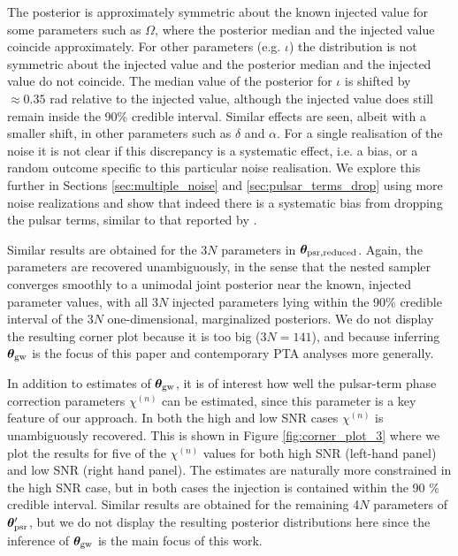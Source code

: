 \documentclass[fleqn,usenatbib,useAMS]{mnras}
\begin{document}
The posterior is approximately symmetric about the known injected value for some parameters such as $\Omega$, where the posterior median and the injected value coincide approximately. For other parameters (e.g. $\iota$) the distribution is not symmetric about the injected value and the posterior median and the injected value do not coincide. The median value of the posterior for $\iota$ is shifted by $\approx 0.35$ rad relative to the injected value, although the injected value does still remain inside the 90\% credible interval. Similar effects are seen, albeit with a smaller shift, in other parameters such as $\delta$ and $\alpha$. For a single realisation of the noise it is not clear if this discrepancy is a systematic effect, i.e. a bias, or a random outcome specific to this particular noise realisation. We explore this further in Sections \ref{sec:multiple_noise} and \ref{sec:pulsar_terms_drop} using more noise realizations and show that indeed there is a systematic bias from dropping the pulsar terms, similar to that reported by \cite{Zhupulsarterms}. \newline 

Similar results are obtained for the 3$N$ parameters in $\boldsymbol{\theta}_{\rm psr, reduced}$. Again, the parameters are recovered unambiguously, in the sense that the nested sampler converges smoothly to a unimodal joint posterior near the known, injected parameter values, with all $3N$ injected parameters lying within the 90\% credible interval of the $3N$ one-dimensional, marginalized posteriors. We do not display the resulting corner plot because it is too big ($3N = 141$), and because inferring ${\boldsymbol{\theta}}_{\rm gw}$ is the focus of this paper and contemporary PTA analyses more generally.


In addition to estimates of $\boldsymbol{\theta}_{\rm gw}$, it is of interest how well the pulsar-term phase correction parameters $\chi^{(n)}$ can be estimated, since this parameter is a key feature of our approach. In both the high and low SNR cases $\chi^{(n)}$ is unambiguously recovered. 
This is shown in Figure \ref{fig:corner_plot_3} where we plot the results for five of the $\chi^{(n)}$ values for both high SNR (left-hand panel) and low SNR (right hand panel). The estimates are naturally more constrained in the high SNR case, but in both cases the injection is contained within the 90 \% credible interval. Similar results are obtained for the remaining 4$N$ parameters of $\boldsymbol{\theta}_{\rm psr}'$, but we do not display the resulting posterior distributions here since the inference of $\boldsymbol{\theta}_{\rm gw}$ is the main focus of this work. 
\end{document}
